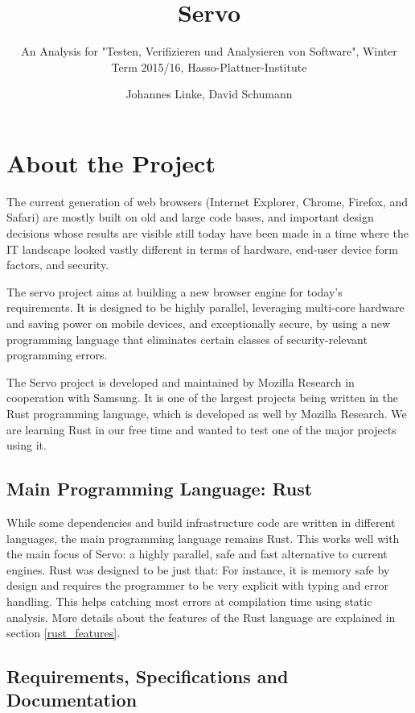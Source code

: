\documentclass{scrartcl}
\begin{document}
\title{Servo}
\subtitle{An Analysis for "Testen, Verifizieren und Analysieren von Software", Winter Term 2015/16, Hasso-Plattner-Institute}
\author{Johannes Linke, David Schumann}
\maketitle


\section{About the Project}

The current generation of web browsers (Internet Explorer, Chrome, Firefox, and Safari) are mostly built on old and large code bases, and important design decisions whose results are visible still today have been made in a time where the IT landscape looked vastly different in terms of hardware, end-user device form factors, and security.

The servo project aims at building a new browser engine for today's requirements. It is designed to be highly parallel, leveraging multi-core hardware and saving power on mobile devices, and exceptionally secure, by using a new programming language that eliminates certain classes of security-relevant programming errors.

The Servo project is developed and maintained by Mozilla Research in cooperation with Samsung. It is one of the largest projects being written in the Rust programming language, which is developed as well by Mozilla Research. We are learning Rust in our free time and wanted to test one of the major projects using it.


\subsection{Main Programming Language: Rust}

While some dependencies and build infrastructure code are written in different languages, the main programming language remains Rust. This works well with the main focus of Servo: a highly parallel, safe and fast alternative to current engines. Rust was designed to be just that: For instance, it is memory safe by design and requires the programmer to be very explicit with typing and error handling. This helps catching most errors at compilation time using static analysis. More details about the features of the Rust language are explained in section \ref{rust_features}.


\subsection{Requirements, Specifications and Documentation}
\end{document}
